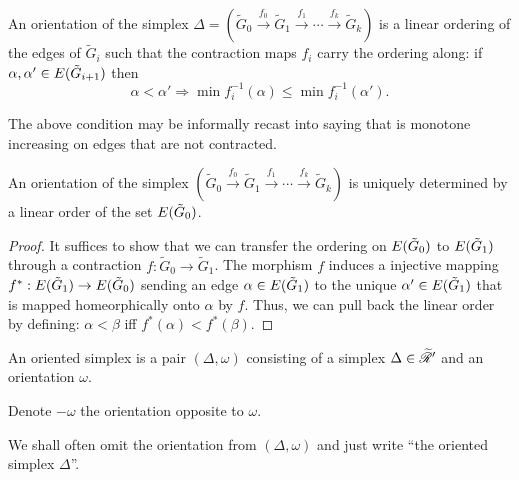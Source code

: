 \begin{definition}
  An orientation of the simplex $\Delta = ({\tilde G}_0 \overset{f_0}\to {\tilde
    G}_1 \overset{f_1}\to \cdots \overset{f_k}\to {\tilde G}_k)$ is a linear
  ordering of the edges of $\tilde G_i$ such that the contraction maps
  $f_i$ carry the ordering along: if $\alpha, \alpha' \in E({\tilde G}_{i+1})$ then
  \begin{equation*}
    \alpha < \alpha' \Rightarrow \min f_i^{-1}(\alpha) \leq \min f_i^{-1}(\alpha').
  \end{equation*}
\end{definition}
The above condition may be informally recast into saying that is
monotone increasing on edges that are not contracted.
\begin{lemma}
  An orientation of the simplex $({\tilde G}_0 \overset{f_0}\to {\tilde
    G}_1 \overset{f_1}\to \cdots \overset{f_k}\to {\tilde G}_k)$ is uniquely
  determined by a linear order of the set $E({\tilde G}_0)$.
\end{lemma}
\begin{proof}
  It suffices to show that we can transfer the ordering on
  $E({\tilde G}_0)$ to $E({\tilde G}_1)$ through a
  contraction $f: {\tilde G}_0 \to {\tilde G}_1$.
  The morphism $f$ induces a injective mapping $f^*: E({\tilde
      G}_1) \to E({\tilde G}_0)$ sending an edge $\alpha \in
  E({\tilde G}_1)$ to the unique $\alpha' \in E({\tilde G}_1)$ that
  is mapped homeorphically onto $\alpha$ by $f$.  Thus, we can pull back
  the linear order by defining: $\alpha < \beta$ iff $f^*(\alpha) < f^*(\beta)$. 
\end{proof}

\begin{definition}
  An oriented simplex is a pair $(\Delta, \omega)$ consisting of a simplex $\Delta \in
  \mathscr{\widetilde R}_{}'$ and an orientation $\omega$.

  Denote $-\omega$ the orientation opposite to $\omega$.  
\end{definition}
We shall often omit the orientation from $(\Delta, \omega)$ and just write ``the
oriented simplex $\Delta$''.

